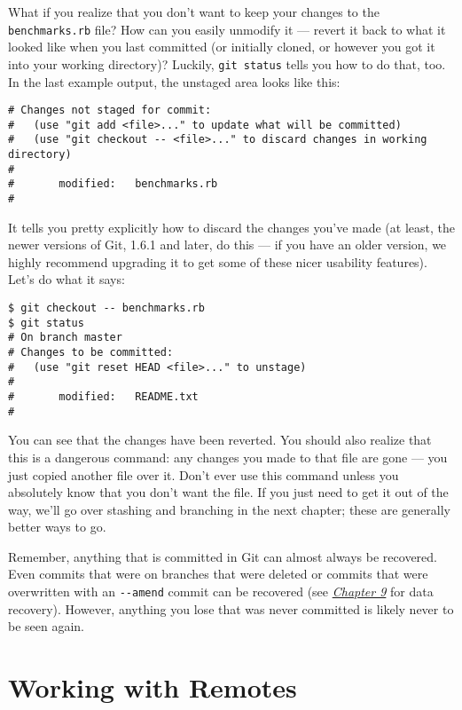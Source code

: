 \documentclass[a4paper]{book}
\newcommand{\prechap}{Chapter }
\newcommand{\postchap}{}
\newcommand{\chapref}[1]{\hyperref[chap:#1]{\prechap #1\postchap}}
\begin{document}
What if you realize that you don't want to keep your changes to the \texttt{benchmarks.rb} file? How can you easily unmodify it --- revert it back to what it looked like when you last committed (or initially cloned, or however you got it into your working directory)? Luckily, \texttt{git status} tells you how to do that, too. In the last example output, the unstaged area looks like this:

\begin{shaded}\begin{verbatim}
# Changes not staged for commit:
#   (use "git add <file>..." to update what will be committed)
#   (use "git checkout -- <file>..." to discard changes in working directory)
#
#       modified:   benchmarks.rb
#
\end{verbatim}\end{shaded}

It tells you pretty explicitly how to discard the changes you've made (at least, the newer versions of Git, 1.6.1 and later, do this --- if you have an older version, we highly recommend upgrading it to get some of these nicer usability features). Let's do what it says:

\begin{shaded}\begin{verbatim}
$ git checkout -- benchmarks.rb
$ git status
# On branch master
# Changes to be committed:
#   (use "git reset HEAD <file>..." to unstage)
#
#       modified:   README.txt
#
\end{verbatim}\end{shaded}

You can see that the changes have been reverted. You should also realize that this is a dangerous command: any changes you made to that file are gone --- you just copied another file over it. Don't ever use this command unless you absolutely know that you don't want the file. If you just need to get it out of the way, we'll go over stashing and branching in the next chapter; these are generally better ways to go.

Remember, anything that is committed in Git can almost always be recovered. Even commits that were on branches that were deleted or commits that were overwritten with an \texttt{-{}-amend} commit can be recovered (see \emph{\chapref{9}} for data recovery). However, anything you lose that was never committed is likely never to be seen again.

\section{Working with Remotes}
\end{document}
